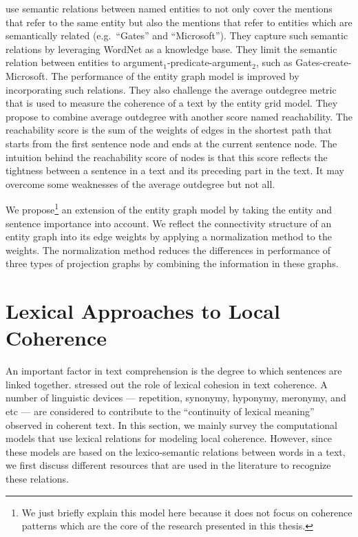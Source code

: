  use semantic relations between named entities to not only cover 
the mentions that refer to the same entity but also the mentions that refer to entities which are semantically related (e.g.\ ``Gates'' and ``Microsoft''). 
They capture such semantic relations by leveraging WordNet \cite{baccianella10} as a knowledge base. 
They limit the semantic relation between entities to argument$_1$-predicate-argument$_2$, such as \mbox{Gates-create-Microsoft}. 
The performance of the entity graph model is improved by incorporating such relations. 
They also challenge the average outdegree metric that is used to measure the coherence of a text by the entity grid model.  
They propose to combine average outdegree with another score named reachability. 
The reachability score is the sum of the weights of edges in the shortest path that starts from the first sentence node and ends at the current sentence node. 
The intuition behind the reachability score of nodes is that this score reflects the tightness between a sentence in a text and its preceding part in the text. 
It may overcome some weaknesses of the average outdegree but not all.  

We propose\footnote{We just briefly explain this model here because it does not focus on coherence patterns which are the core of the research presented in this thesis.} \cite{mesgar14} an extension of the entity graph model by taking the entity and sentence importance into account. 
We reflect the connectivity structure of an entity graph into its edge weights by applying a normalization method to the weights.  
The normalization method reduces the differences in performance of three types of projection graphs by combining the information in these graphs. 


\section{Lexical Approaches to Local Coherence}

An important factor in text comprehension is the degree to which sentences are linked together. 
 stressed out the role of lexical cohesion in text coherence. 
A number of linguistic devices — repetition, synonymy, hyponymy, meronymy, and etc — are considered to contribute to the ``continuity of lexical meaning'' observed in coherent text. 
In this section, we mainly survey the computational models that use lexical relations for modeling local coherence. 
However, since these models are based on the lexico-semantic relations between words in a text, we first discuss different resources that are used in the literature to recognize these relations. 

